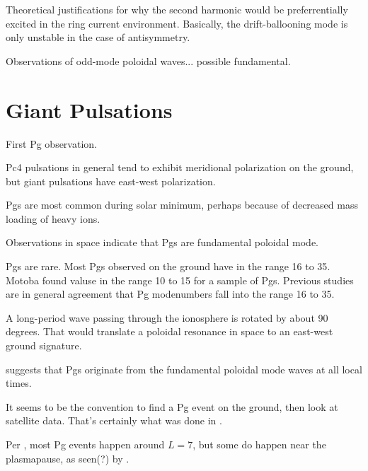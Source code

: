 Theoretical justifications for why the second harmonic would be preferrentially excited in the ring current environment. Basically, the drift-ballooning mode is only unstable in the case of antisymmetry\cite{southwood_1976,chen_1991,cheng_1994,chan_1994}. 

Observations of odd-mode poloidal waves... possible fundamental\cite{yang_2010,eriksson_2005}.

\section{Giant Pulsations}

First Pg observation\cite{birkeland_1901}. 

Pc4 pulsations in general tend to exhibit meridional polarization on the ground, but giant pulsations have east-west polarization\cite{takahashi_1992}. 

Pgs are most common during solar minimum, perhaps because of decreased mass loading of heavy ions\cite{denton_2011}. 

Observations in space indicate that Pgs are fundamental poloidal mode\cite{kokubun_1980,hillebrand_1982,kokubun_1989,takahashi_1992,glassmeier_1999}. 

Pgs are rare\cite{brekke_1987}. Most Pgs observed on the ground have \azm in the range 16 to 35\cite{takahashi_1992}. Motoba\cite{motoba_2015} found \azm valuse in the range 10 to 15 for a sample of Pgs. Previous studies\cite{rostoker_1979,glassmeier_1980,hillebrand_1982,poulter_1983} are in general agreement that Pg modenumbers fall into the range 16 to 35. 

A long-period \Alfven wave passing through the ionosphere is rotated by about 90 degrees\cite{nishida_1964_screening,hughes_1974}. That would translate a poloidal resonance in space to an east-west ground signature. 

\cite{motoba_2015} suggests that Pgs originate from the fundamental poloidal mode waves at all local times. 

It seems to be the convention to find a Pg event on the ground, then look at satellite data. That's certainly what was done in \cite{motoba_2015}. 

Per \cite{motoba_2015}, most Pg events happen around $L=7$, but some do happen near the plasmapause, as seen(?) by \cite{green_1985}. 

